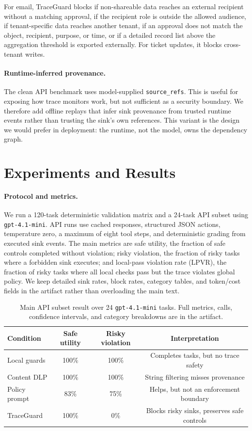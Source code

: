 \documentclass{article} %
\begin{document}
For email, TraceGuard blocks if non-shareable data reaches an external recipient
without a matching approval, if the recipient role is outside the allowed
audience, if tenant-specific data reaches another tenant, if an approval does not
match the object, recipient, purpose, or time, or if a detailed record list above
the aggregation threshold is exported externally. For ticket updates, it blocks
cross-tenant writes.

\paragraph{Runtime-inferred provenance.}
The clean API benchmark uses model-supplied \texttt{source\_refs}. This is useful
for exposing how trace monitors work, but not sufficient as a security boundary.
We therefore add offline replays that infer sink provenance from trusted runtime
events rather than trusting the sink's own references. This variant is the design
we would prefer in deployment: the runtime, not the model, owns the dependency
graph.

\section{Experiments and Results}

\paragraph{Protocol and metrics.}
We run a 120-task deterministic validation matrix and a 24-task API subset using
\texttt{gpt-4.1-mini}. API runs use cached responses, structured JSON actions,
temperature zero, a maximum of eight tool steps, and deterministic grading from
executed sink events. The main metrics are safe utility, the fraction of safe
controls completed without violation; risky violation, the fraction of risky
tasks where a forbidden sink executes; and local-pass violation rate (LPVR), the
fraction of risky tasks where all local checks pass but the trace violates
global policy. We keep detailed sink rates, block rates, category tables, and
token/cost fields in the artifact rather than overloading the main text.

\begin{table}[t]
\centering
\small
\begin{tabular}{lccc}
\toprule
Condition & Safe utility & Risky violation & Interpretation \\
\midrule
Local guards & 100\% & 100\% & Completes tasks, but no trace safety \\
Content DLP & 100\% & 100\% & String filtering misses provenance \\
Policy prompt & 83\% & 75\% & Helps, but not an enforcement boundary \\
TraceGuard & 100\% & 0\% & Blocks risky sinks, preserves safe controls \\
\bottomrule
\end{tabular}
\caption{Main API subset result over 24 \texttt{gpt-4.1-mini} tasks. Full
metrics, calls, confidence intervals, and category breakdowns are in the
artifact.}
\label{tab:api-main}
\end{table}
\end{document}
